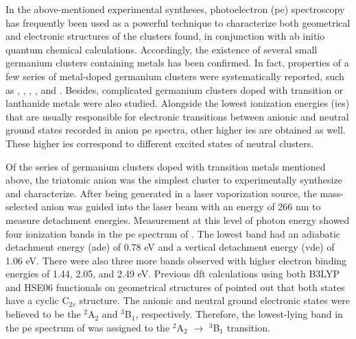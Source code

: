 \begin{refsection}
In the above-mentioned experimental syntheses, photoelectron (\acrshort{pe}) spectroscopy has frequently been used as a powerful technique to characterize both geometrical and electronic structures of the clusters found, in conjunction with ab initio quantum chemical calculations. \cite{c4:13, c4:14, c4:15, c4:16, c4:19, c4:21} Accordingly, the existence of several small germanium clusters containing metals has been confirmed. In fact, properties of a few series of metal-doped germanium clusters were systematically reported, \cite{c4:15, c4:16, c4:19, c4:21, c4:22, c4:23} such as , , , , and . Besides, complicated germanium clusters doped with transition or lanthanide metals were also studied. \cite{c4:14} Alongside the lowest ionization energies (\acrshort{ie}s) that are usually responsible for electronic transitions between anionic and neutral ground states recorded in anion \acrshort{pe} spectra, other higher \acrshort{ie}s are obtained as well. These higher \acrshort{ie}s correspond to different excited states of neutral clusters. 




Of the series of germanium clusters doped with transition metals mentioned above, the triatomic anion  was the simplest cluster to experimentally synthesize and characterize. \cite{c4:22} After being generated in a laser vaporization source, the
mass-selected anion  was guided into the laser beam with an energy of 266 nm to measure detachment energies. Measurement at this level of photon energy showed four ionization bands in the \acrshort{pe} spectrum of . The lowest band had an adiabatic detachment energy (\acrshort{ade}) of 0.78 eV and a vertical detachment energy (\acrshort{vde}) of 1.06 eV. There were also three more bands observed with higher electron binding energies of 1.44, 2.05, and 2.49 eV. Previous \acrshort{dft} calculations using both B3LYP and HSE06 functionals on geometrical structures of  pointed out that both states have a cyclic C$_{2v}$ structure. \cite{c4:22, c4:24} The anionic and neutral ground electronic states were believed to be the $^2$A$_2$ and $^3$B$_1$, respectively. \cite{c4:22} Therefore, the lowest-lying band in the \acrshort{pe} spectrum of  was assigned to the $^2$A$_2$ $\longrightarrow$ $^3$B$_1$ transition. 





\end{refsection}
